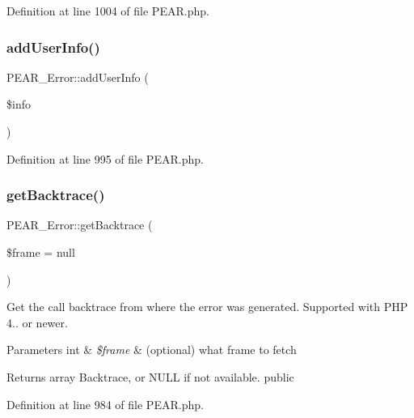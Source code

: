 Definition at line 1004 of file P\+E\+A\+R.\+php.

\mbox{\label{classPEAR__Error_a229db64a10b64f41644ec19cf3c1e47b}} 
\subsubsection{\texorpdfstring{add\+User\+Info()}{addUserInfo()}}
{\footnotesize\ttfamily P\+E\+A\+R\+\_\+\+Error\+::add\+User\+Info (\begin{DoxyParamCaption}\item[{}]{\$info }\end{DoxyParamCaption})}



Definition at line 995 of file P\+E\+A\+R.\+php.

\mbox{\label{classPEAR__Error_a7892a046070c977e5fcba9fcb749673d}} 
\subsubsection{\texorpdfstring{get\+Backtrace()}{getBacktrace()}}
{\footnotesize\ttfamily P\+E\+A\+R\+\_\+\+Error\+::get\+Backtrace (\begin{DoxyParamCaption}\item[{}]{\$frame = {\ttfamily null} }\end{DoxyParamCaption})}

Get the call backtrace from where the error was generated. Supported with P\+HP 4.. or newer.


\begin{DoxyParams}[1]{Parameters}
int & {\em \$frame} & (optional) what frame to fetch \\
\hline
\end{DoxyParams}
\begin{DoxyReturn}{Returns}
array Backtrace, or N\+U\+LL if not available.  public 
\end{DoxyReturn}


Definition at line 984 of file P\+E\+A\+R.\+php.

